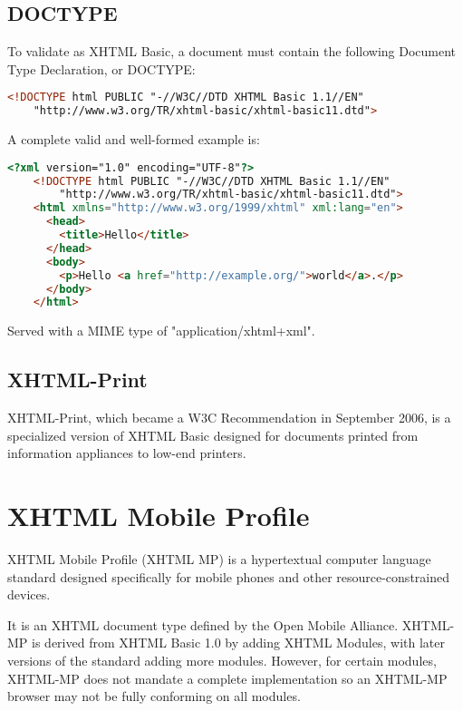 \section{DOCTYPE}

To validate as XHTML Basic, a document must contain the following Document Type Declaration, or DOCTYPE:


\begin{lstlisting}[language=HTML]
	<!DOCTYPE html PUBLIC "-//W3C//DTD XHTML Basic 1.1//EN"
	"http://www.w3.org/TR/xhtml-basic/xhtml-basic11.dtd">
\end{lstlisting}


A complete valid and well-formed example is:

\begin{lstlisting}[language=HTML]
	<?xml version="1.0" encoding="UTF-8"?>
	<!DOCTYPE html PUBLIC "-//W3C//DTD XHTML Basic 1.1//EN"
	    "http://www.w3.org/TR/xhtml-basic/xhtml-basic11.dtd">
	<html xmlns="http://www.w3.org/1999/xhtml" xml:lang="en">
	  <head>
	    <title>Hello</title>
	  </head>
	  <body>
	    <p>Hello <a href="http://example.org/">world</a>.</p>
	  </body>
	</html>
\end{lstlisting}

Served with a MIME type of "application/xhtml+xml".

\section{XHTML-Print}

XHTML-Print, which became a W3C Recommendation in September 2006, is a specialized version of XHTML Basic designed for documents printed from information appliances to low-end printers.

\chapter{XHTML Mobile Profile}

XHTML Mobile Profile (XHTML MP) is a hypertextual computer language standard designed specifically for mobile phones and other resource-constrained devices.


It is an XHTML document type defined by the Open Mobile Alliance. XHTML-MP is derived from XHTML Basic 1.0 by adding XHTML Modules, with later versions of the standard adding more modules. However, for certain modules, XHTML-MP does not mandate a complete implementation so an XHTML-MP browser may not be fully conforming on all modules.

